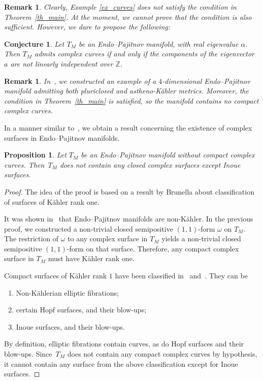\documentclass[10pt,a4paper]{amsart}
\newcommand{\6}{\partial}
\numberwithin{equation}{section}
\newtheorem{Proposition}[Theorem]{Proposition}
\newtheorem{Conjecture}[Theorem]{Conjecture}
\newtheorem{Remark}[Theorem]{Remark}
\begin{document}
\begin{Remark}
	Clearly, Example \ref{ex_curves} does not satisfy the condition in Theorem~\ref{th_main}. At the moment, we cannot prove that the condition is also sufficient. However, we dare to propose the following:
\end{Remark}

\begin{Conjecture}
	Let $T_M$ be an Endo--Pajitnov manifold, with real eigenvalue $\alpha$. Then $T_M$ admits complex curves if and only if the components of the eigenvector $a$ are not linearly independent over $\mathbb{Z}$.
\end{Conjecture}

\begin{Remark}
 In~\cite[Example 5.8]{cos}, we constructed an example of a $4$-dimensional Endo--Pajitnov manifold admitting both pluriclosed and astheno-K\"ahler metrics. Moreover, the condition in Theorem~\ref{th_main} is satisfied, so the manifold contains no compact complex curves.
\end{Remark}

In a manner similar to~\cite{v_2}, we obtain a result concerning the existence of complex surfaces in Endo--Pajitnov manifolds.

\begin{Proposition} \label{sup}
 Let $T_M$ be an Endo--Pajitnov manifold without compact complex curves. Then~$T_M$ does not contain any closed complex surfaces except Inoue surfaces.
\end{Proposition}

\begin{proof}
 The idea of the proof is based on a result by Brunella about classification of surfaces of K\"ahler rank one.

 It was shown in~\cite{pajitnov1} that Endo--Pajitnov manifolds are non-K\"ahler. In the previous proof, we constructed a non-trivial closed semipositive $(1,1)$-form $\omega$ on $T_M$. The restriction of $\omega$ to any complex surface in $T_M$ yields a non-trivial closed semipositive $(1,1)$-form on that surface. Therefore, any compact complex surface in $T_M$ must have K\"ahler rank one.

 Compact surfaces of K\"ahler rank $1$ have been classified in~\cite{ct} and~\cite{br}. They can be
 \begin{enumerate}\itemsep=0pt
 \item Non-K\"ahlerian elliptic fibrations;
 \item certain Hopf surfaces, and their blow-ups;
 \item Inoue surfaces, and their blow-ups.
\end{enumerate}

By definition, elliptic fibrations contain curves, as do Hopf surfaces and their blow-ups. Since~$T_M$ does not contain any compact complex curves by hypothesis, it cannot contain any surface from the above classification except for Inoue surfaces.
\end{proof}
\end{document}
